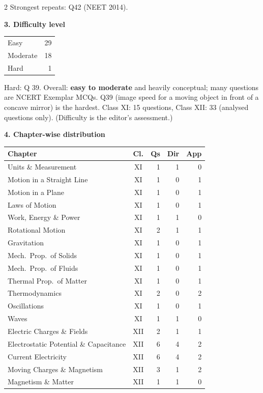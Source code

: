 \begin{multicols}{2}
{\footnotesize Strongest repeats: Q42 (NEET 2014).}\par\medskip
\textbf{\color{crimson}3. Difficulty level}\par\smallskip
\begin{tabular}{@{}lr@{}}\toprule
Easy & 29\\ Moderate & 18\\ Hard & 1\\\bottomrule\end{tabular}\par\smallskip
{\footnotesize Hard: Q 39. Overall: \textbf{easy to moderate} and heavily conceptual; many questions are NCERT Exemplar MCQs. Q39 (image speed for a moving object in front of a concave mirror) is the hardest. Class XI: 15 questions, Class XII: 33 (analysed questions only). (Difficulty is the editor's assessment.)}\par\medskip
\columnbreak
\textbf{\color{crimson}4. Chapter-wise distribution}\par\smallskip
{\footnotesize\begin{tabular}{@{}p{4.7cm}c@{\,}r@{\,}r@{\,}r@{}}\toprule
Chapter & Cl. & Qs & Dir & App\\\midrule
Units \& Measurement & XI & 1 & 1 & 0\\
Motion in a Straight Line & XI & 1 & 0 & 1\\
Motion in a Plane & XI & 1 & 0 & 1\\
Laws of Motion & XI & 1 & 0 & 1\\
Work, Energy \& Power & XI & 1 & 1 & 0\\
Rotational Motion & XI & 2 & 1 & 1\\
Gravitation & XI & 1 & 0 & 1\\
Mech.\ Prop.\ of Solids & XI & 1 & 0 & 1\\
Mech.\ Prop.\ of Fluids & XI & 1 & 0 & 1\\
Thermal Prop.\ of Matter & XI & 1 & 0 & 1\\
Thermodynamics & XI & 2 & 0 & 2\\
Oscillations & XI & 1 & 0 & 1\\
Waves & XI & 1 & 1 & 0\\
Electric Charges \& Fields & XII & 2 & 1 & 1\\
Electrostatic Potential \& Capacitance & XII & 6 & 4 & 2\\
Current Electricity & XII & 6 & 4 & 2\\
Moving Charges \& Magnetism & XII & 3 & 1 & 2\\
Magnetism \& Matter & XII & 1 & 1 & 0\\

\end{tabular}}
\end{multicols}
